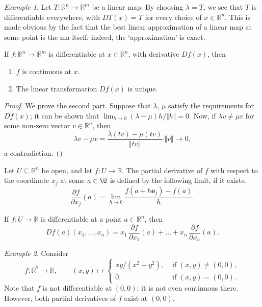 \documentclass[11pt]{article}
\newcommand{\R}{\mathbb{R}}
\newcommand{\norm}[1]{\Vert #1 \Vert}
\renewcommand{\vec}[1]{\boldsymbol{#1}}
\newcommand{\pp}[2]{\frac{\partial #1}{\partial #2}}
\theoremstyle{definition}
\theoremstyle{remark}
\newtheorem*{example}{Example}
\numberwithin{equation}{section}
\begin{document}
    \begin{example}
        Let $T\colon \R^n \to \R^m$ be a linear map. By choosing $\lambda = T$, we
        see that $T$ is differentiable everywhere, with $DT(x) = T$ for every choice
        of $x \in \R^n$. This is made obvious by the fact that the best linear
        approximation of a linear map at some point is the ma itself; indeed, the
        `approximation' is exact.
    \end{example}

    \begin{lemma}
        If $f\colon \R^n \to \R^m$ is differentiable at $x \in \R^n$, with derivative
        $Df(x)$, then
        \begin{enumerate}
            \itemsep0em
            \item $f$ is continuous at $x$.
            \item The linear transformation $Df(x)$ is unique.
        \end{enumerate}
    \end{lemma}
    \begin{proof}
        We prove the second part. Suppose that $\lambda$, $\mu$ satisfy the
        requirements for $Df(x)$; it can be shown that $\lim_{h \to 0} (\lambda -
        \mu)h / \norm{h} = 0$. Now, if $\lambda v \neq \mu v$ for some non-zero
        vector $v \in \R^n$, then \[
            \lambda v - \mu v = \frac{\lambda(tv) - \mu(tv)}{\norm{tv}} \cdot
            \norm{v} \to 0,
        \] a contradiction.
    \end{proof}

    \begin{definition}
        Let $U \subseteq \R^n$ be open, and let $f\colon U \to \R$. The partial
        derivative of $f$ with respect to the coordinate $x_j$ at some $a \in \U$
        is defined by the following limit, if it exists. \[
            \pp{f}{x_j}(a) = \lim_{h \to 0} \frac{f(a + h\vec{e}_j) - f(a)}{h}.
        \] 
    \end{definition}
    \begin{lemma}
        If $f\colon U \to \R$ is differentiable at a point $a \in \R^n$, then \[
            Df(a)(x_1, \dots, x_n) = x_1 \,\pp{f}{x_1}(a) + \dots + x_n
            \,\pp{f}{x_n}(a).
        \] 
    \end{lemma}
    \begin{example}
        Consider \[
            f\colon \R^2 \to \R, \qquad (x, y) \mapsto \begin{cases}
                xy/(x^2 + y^2), &\text{ if } (x, y) \neq (0, 0), \\
                0, &\text{ if } (x, y) = (0, 0).
            \end{cases}
        \] Note that $f$ is not differentiable at $(0, 0)$; it is not even continuous
        there. However, both partial derivatives of $f$ exist at $(0, 0)$.
    \end{example}
    
\end{document}
